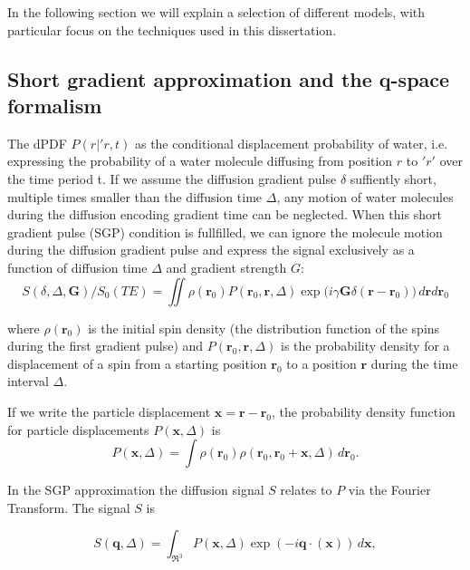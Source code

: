 In the following section we will explain a selection of different models, with particular focus on the techniques used in this dissertation. 
\subsection{Short gradient approximation and the q-space formalism}
The \gls{dPDF} $P(r|\prime{r},t)$ as the conditional displacement probability of water, i.e. expressing the probability of a water molecule diffusing from position $r$ to $\prime{r}'$ over the time period t. If we assume the diffusion gradient pulse $\delta$ suffiently short, multiple times smaller than the diffusion time $\Delta$, any motion of water molecules during the diffusion encoding gradient time can be neglected. When this short gradient pulse (SGP) condition is fullfilled, we can ignore the molecule motion during the diffusion gradient pulse and express the signal exclusively as a function of diffusion time $\Delta$ and gradient strength $G$\citep{Callaghan:1991}:
\begin{equation}
S(\delta,\Delta,\textbf{G})/S_{0}(TE) = \iint \rho(\textbf{r}_{0})P(\textbf{r}_{0},\textbf{r},\Delta)\exp\Big(i \gamma \textbf{G} \delta (\textbf{r}-\textbf{r}_{0}) \Big)\,d\textbf{r} d\textbf{r}_{0}
\label{eq:chapter2 signal in sgp}
\end{equation}

where $\rho(\textbf{r}_{0})$ is the initial spin density (the distribution function of the spins during the first gradient pulse)
and $P(\textbf{r}_{0},\textbf{r},\Delta)$ is the probability density for a displacement of a spin from a starting position $\textbf{r}_{0}$ to a position $\textbf{r}$ during the time interval $\Delta$. 

If we write the particle displacement $\textbf{x} = \textbf{r}-\textbf{r}_{0}$, the probability density function for particle  displacements  $P(\textbf{x},\Delta)$ is
\begin{equation}
P(\textbf{x},\Delta) = \int\rho(\textbf{r}_{0})\rho(\textbf{r}_{0},\textbf{r}_{0} + \textbf{x}, \Delta)\,d\textbf{r}_{0}.      %
\end{equation}

In the SGP approximation the diffusion signal $S$ relates to $P$ via the Fourier Transform. The signal $S$ is

\begin{equation}
S(\textbf{q},\Delta)=\int_{\Re^3}P(\textbf{x},\Delta)\exp(-i\textbf{q}\cdot(\textbf{x}))\,d\textbf{x},
\label{fourier}
\end{equation}

